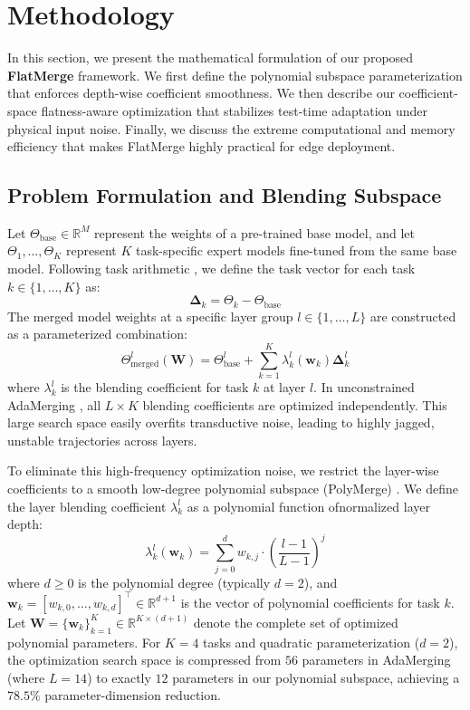 \section{Methodology}
\label{sec:method}

In this section, we present the mathematical formulation of our proposed \textbf{FlatMerge} framework. 
We first define the polynomial subspace parameterization that enforces depth-wise coefficient smoothness. 
We then describe our coefficient-space flatness-aware optimization that stabilizes test-time adaptation under physical input noise. 
Finally, we discuss the extreme computational and memory efficiency that makes FlatMerge highly practical for edge deployment.

\subsection{Problem Formulation and Blending Subspace}
Let $\Theta_{\text{base}} \in \mathbb{R}^M$ represent the weights of a pre-trained base model, and let $\Theta_1, \dots, \Theta_K$ represent $K$ task-specific expert models fine-tuned from the same base model. 
Following task arithmetic \cite{ilharco2022editing}, we define the task vector for each task $k \in \{1, \dots, K\}$ as:
\begin{equation}
    \mathbf{\Delta}_k = \Theta_k - \Theta_{\text{base}}
\end{equation}
The merged model weights at a specific layer group $l \in \{1, \dots, L\}$ are constructed as a parameterized combination:
\begin{equation}
    \Theta^l_{\text{merged}}(\mathbf{W}) = \Theta^l_{\text{base}} + \sum_{k=1}^K \lambda^l_k(\mathbf{w}_k) \mathbf{\Delta}^l_k
\end{equation}
where $\lambda^l_k$ is the blending coefficient for task $k$ at layer $l$. 
In unconstrained AdaMerging \cite{yang2024adamerging}, all $L \times K$ blending coefficients are optimized independently. 
This large search space easily overfits transductive noise, leading to highly jagged, unstable trajectories across layers.

To eliminate this high-frequency optimization noise, we restrict the layer-wise coefficients to a smooth low-degree polynomial subspace (PolyMerge) \cite{polymerge}. 
We define the layer blending coefficient $\lambda^l_k$ as a polynomial function ofnormalized layer depth:
\begin{equation}
    \lambda^l_k(\mathbf{w}_k) = \sum_{j=0}^d w_{k, j} \cdot \left(\frac{l-1}{L-1}\right)^j
\end{equation}
where $d \ge 0$ is the polynomial degree (typically $d = 2$), and $\mathbf{w}_k = [w_{k, 0}, \dots, w_{k, d}]^\top \in \mathbb{R}^{d+1}$ is the vector of polynomial coefficients for task $k$. 
Let $\mathbf{W} = \{\mathbf{w}_k\}_{k=1}^K \in \mathbb{R}^{K \times (d+1)}$ denote the complete set of optimized polynomial parameters. 
For $K=4$ tasks and quadratic parameterization ($d=2$), the optimization search space is compressed from $56$ parameters in AdaMerging (where $L=14$) to exactly $12$ parameters in our polynomial subspace, achieving a $78.5\%$ parameter-dimension reduction.

